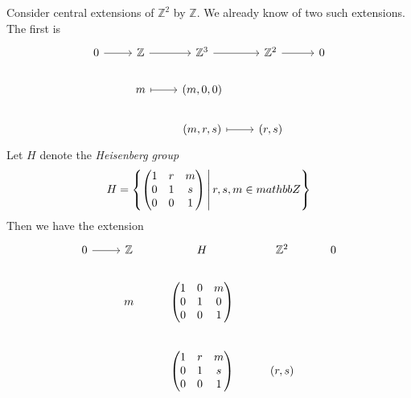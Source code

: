 \begin{example}
    Consider central extensions of \( \mathbb Z^2 \) by \( \mathbb Z \).
    We already know of two such extensions.
    The first is
\[\begin{tikzcd}
	0 & {\mathbb Z} & {\mathbb Z^3} & {\mathbb Z^2} & 0 \\
	& m & {(m, 0, 0)} \\
	&& {(m, r, s)} & {(r, s)}
	\arrow[from=1-1, to=1-2]
	\arrow[from=1-2, to=1-3]
	\arrow[from=1-3, to=1-4]
	\arrow[from=1-4, to=1-5]
	\arrow[maps to, from=2-2, to=2-3]
	\arrow[maps to, from=3-3, to=3-4]
\end{tikzcd}\]
    Let \( H \) denote the \emph{Heisenberg group}
    \[ H = \qty{\begin{pmatrix}
        1 & r & m \\
        0 & 1 & s \\
        0 & 0 & 1
    \end{pmatrix} \,\middle|\,r, s, m \in mathbb Z} \]
    Then we have the extension
\[\begin{tikzcd}[ampersand replacement=\&]
	0 \& {\mathbb Z} \& H \& {\mathbb Z^2} \& 0 \\
	\& m \& {\begin{pmatrix}1&0&m\\0&1&0\\0&0&1\end{pmatrix}} \\
	\&\& {\begin{pmatrix}1&r&m\\0&1&s\\0&0&1\end{pmatrix}} \& {(r, s)}
	\arrow[from=1-1, to=1-2]

\end{tikzcd}\]
\end{example}
